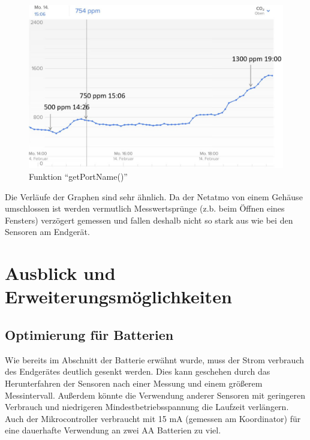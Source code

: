 \documentclass[]{article}
\begin{document}
			\begin{figure}[!h]
				\centering
				\includegraphics[scale=0.18]{images/CO2_NETATMO}
				\caption{Funktion “getPortName()”}
				\label{img:CO2_NETATMO}
			\end{figure}
		
		
			Die Verläufe der Graphen sind sehr ähnlich. Da der Netatmo von einem Gehäuse umschlossen ist werden vermutlich Messwertsprünge (z.b. beim Öffnen eines Fensters) verzögert gemessen und fallen deshalb nicht so stark aus wie bei den Sensoren am Endgerät.
			\clearpage
	\section{Ausblick und Erweiterungsmöglichkeiten}
		\subsection{Optimierung für Batterien}
			Wie bereits im Abschnitt der Batterie erwähnt wurde, muss der Strom verbrauch des Endgerätes deutlich gesenkt werden.
			Dies kann geschehen durch das Herunterfahren der Sensoren nach einer Messung und einem größerem Messintervall. Außerdem könnte die Verwendung anderer Sensoren mit geringeren Verbrauch und niedrigeren Mindestbetriebsspannung die Laufzeit verlängern. Auch der Mikrocontroller verbraucht mit 15 mA (gemessen am Koordinator) für eine dauerhafte Verwendung an zwei AA Batterien zu viel.
		
\end{document}
